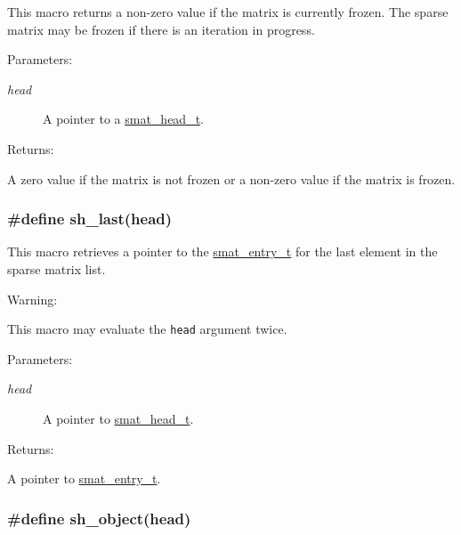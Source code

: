 This macro returns a non-zero value if the matrix is currently frozen. The sparse matrix may be frozen if there is an iteration in progress.\begin{Desc}
\item[Parameters: ]\par
\begin{description}
\item[{\em 
head}]A pointer to a \hyperlink{group__dbprim__smat_a1}{smat\_\-head\_\-t}.\end{description}
\end{Desc}
\begin{Desc}
\item[Returns: ]\par
A zero value if the matrix is not frozen or a non-zero value if the matrix is frozen. \end{Desc}
\hypertarget{group__dbprim__smat_a35}{
\subsubsection[sh\_\-last]{\setlength{\rightskip}{0pt plus 5cm}\#define sh\_\-last(head)}}
\label{group__dbprim__smat_a35}


This macro retrieves a pointer to the \hyperlink{group__dbprim__smat_a2}{smat\_\-entry\_\-t} for the last element in the sparse matrix list.

\begin{Desc}
\item[Warning: ]\par
This macro may evaluate the {\tt head} argument twice.\end{Desc}
\begin{Desc}
\item[Parameters: ]\par
\begin{description}
\item[{\em 
head}]A pointer to \hyperlink{group__dbprim__smat_a1}{smat\_\-head\_\-t}.\end{description}
\end{Desc}
\begin{Desc}
\item[Returns: ]\par
A pointer to \hyperlink{group__dbprim__smat_a2}{smat\_\-entry\_\-t}. \end{Desc}
\hypertarget{group__dbprim__smat_a36}{
\subsubsection[sh\_\-object]{\setlength{\rightskip}{0pt plus 5cm}\#define sh\_\-object(head)}}
\label{group__dbprim__smat_a36}



